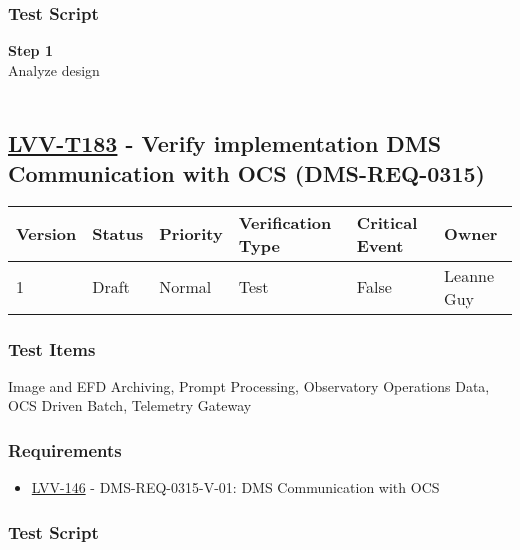 \hypertarget{test-script-159}{%
\subsubsection{Test Script}\label{test-script-159}}

\textbf{Step 1}\\
Analyze design\\
~\\

\hypertarget{lvv-t183---verify-implementation-dms-communication-with-ocs-dms-req-0315}{%
\subsection{\texorpdfstring{\href{https://jira.lsstcorp.org/secure/Tests.jspa\#/testCase/LVV-T183}{LVV-T183}
- Verify implementation DMS Communication with OCS
(DMS-REQ-0315)}{LVV-T183 - Verify implementation DMS Communication with OCS (DMS-REQ-0315)}}\label{lvv-t183---verify-implementation-dms-communication-with-ocs-dms-req-0315}}

\begin{longtable}[]{@{}llllll@{}}
\toprule
Version & Status & Priority & Verification Type & Critical Event &
Owner\tabularnewline
\midrule
\endhead
1 & Draft & Normal & Test & False & Leanne Guy\tabularnewline
\bottomrule
\end{longtable}

\hypertarget{test-items-159}{%
\subsubsection{Test Items}\label{test-items-159}}

Image and EFD Archiving, Prompt Processing, Observatory Operations Data,
OCS Driven Batch, Telemetry Gateway~

\hypertarget{requirements-160}{%
\subsubsection{Requirements}\label{requirements-160}}

\begin{itemize}
\tightlist
\item
  \href{https://jira.lsstcorp.org/browse/LVV-146}{LVV-146} -
  DMS-REQ-0315-V-01: DMS Communication with OCS
\end{itemize}

\hypertarget{test-script-160}{%
\subsubsection{Test Script}\label{test-script-160}}

